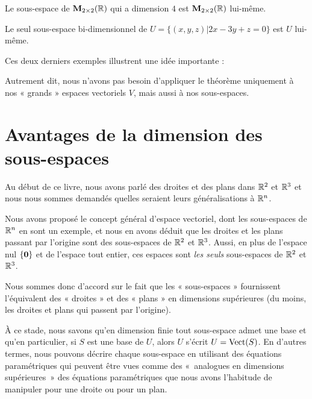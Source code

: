 \begin{myexample} Le sous-espace de $\mathbf{M}_{2\times 2}(\mathbb{R})$ qui a dimension $4$ est
 $\mathbf{M}_{2\times 2}(\mathbb{R})$ lui-même.   \end{myexample}

\begin{myexample}
Le seul sous-espace bi-dimensionnel de $U = \{(x,y,z) | 2x-3y+z = 0\}$ est $U$ lui-même.  \end{myexample}

Ces deux derniers exemples illustrent une idée importante :


Autrement dit, nous n'avons pas besoin d'appliquer le théorème uniquement à nos « grands » espaces vectoriels $V$, mais aussi \`a nos sous-espaces.

\section{Avantages de la dimension des sous-espaces}

Au début de ce livre, nous avons parlé des droites et des plans
dans $\mathbb{R}^2$ et $\mathbb{R}^3$ et nous nous sommes demandés quelles seraient leurs généralisations à
$\mathbb{R}^n$.

Nous avons proposé le concept général d'espace vectoriel, dont les sous-espaces
de $\mathbb{R}^n$ en sont un exemple, et nous en avons déduit que les droites et les plans passant par
l'origine sont des sous-espaces de $\mathbb{R}^2$ et $\mathbb{R}^3$. Aussi, en plus de l'espace nul $\{\mathbf{0}\}$ et de l'espace tout entier, ces espaces sont \emph{les seuls} sous-espaces 
de $\mathbb{R}^2$ et $\mathbb{R}^3$.

Nous sommes donc d'accord sur le fait que les « sous-espaces » fournissent l'équivalent des « droites » et des « plans » en dimensions sup\'erieures
 (du moins, les droites et plans qui passent par l'origine).

\`A ce stade, nous savons qu'en dimension finie tout sous-espace admet une base et qu'en particulier, si $S$
est une base de $U$, alors $U$ s'écrit $U = \textrm{Vect}(S)$.  En d'autres termes, nous pouvons
décrire chaque sous-espace en utilisant des équations paramétriques qui peuvent être vues comme des «~analogues en dimensions sup\'erieures~» des
équations paramétriques que nous avons l'habitude de manipuler pour une droite ou pour un plan.


